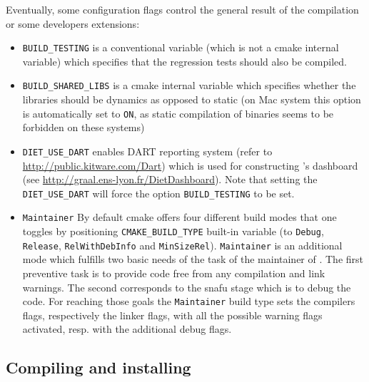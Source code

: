 Eventually, some configuration flags control the general result of the
compilation or some developers extensions:
\begin{itemize}
\item
  \verb+BUILD_TESTING+ is a conventional variable (which is not a cmake
  internal variable) which specifies that the regression tests should also be
  compiled.

\item
  \verb+BUILD_SHARED_LIBS+ is a cmake internal variable which
  specifies whether the libraries should be dynamics as opposed to
  static (on Mac system this option is automatically set to \verb!ON!,
  as static compilation of binaries seems to be forbidden on these
  systems)

\item
  \verb+DIET_USE_DART+ enables DART reporting system (refer to
  \url{http://public.kitware.com/Dart}) which is used for constructing \diet's
  dashboard (see \url{http://graal.ens-lyon.fr/DietDashboard}).  Note that
  setting the \verb+DIET_USE_DART+ will force the option
  \linebreak\verb+BUILD_TESTING+ to be set.

\item
  \verb+Maintainer+ By default cmake offers four different build modes
  that one toggles by positioning \verb+CMAKE_BUILD_TYPE+ built-in
  variable (to \verb+Debug+, \verb+Release+, \verb+RelWithDebInfo+ and
  \verb+MinSizeRel+). \verb+Maintainer+ is an additional mode which
  fulfills two basic needs of the task of the maintainer of \diet. The
  first preventive task is to provide code free from any compilation
  and link warnings. The second corresponds to the snafu stage which
  is to debug the code. For reaching those goals the \verb+Maintainer+
  build type sets the compilers flags, respectively the linker flags,
  with all the possible warning flags activated, resp. with the
  additional debug flags.
\end{itemize}

\subsection{Compiling and installing}

